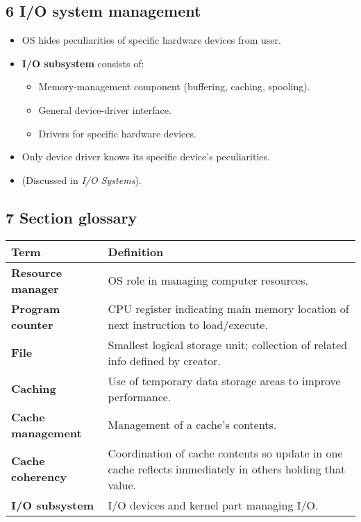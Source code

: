 \documentclass{article}
\begin{document}
\subsection*{6 I/O system management}
\begin{itemize}
    \item OS hides peculiarities of specific hardware devices from user.
    \item \textbf{I/O subsystem} consists of:
    \begin{itemize}
        \item Memory-management component (buffering, caching, spooling).
        \item General device-driver interface.
        \item Drivers for specific hardware devices.
    \end{itemize}
    \item Only device driver knows its specific device's peculiarities.
    \item (Discussed in \textit{I/O Systems}).
\end{itemize}

\subsection*{7 Section glossary}
\centering
\begin{tabular}{>{\raggedright}p{} >{\raggedright\arraybackslash}p{}}
\toprule
\textbf{Term} & \textbf{Definition} \\
\midrule
\textbf{Resource manager} & OS role in managing computer resources. \\
\textbf{Program counter} & CPU register indicating main memory location of next instruction to load/execute. \\
\textbf{File} & Smallest logical storage unit; collection of related info defined by creator. \\
\textbf{Caching} & Use of temporary data storage areas to improve performance. \\
\textbf{Cache management} & Management of a cache's contents. \\
\textbf{Cache coherency} & Coordination of cache contents so update in one cache reflects immediately in others holding that value. \\
\textbf{I/O subsystem} & I/O devices and kernel part managing I/O. \\
\bottomrule
\end{tabular}
\vspace{\baselineskip}
\end{document}
